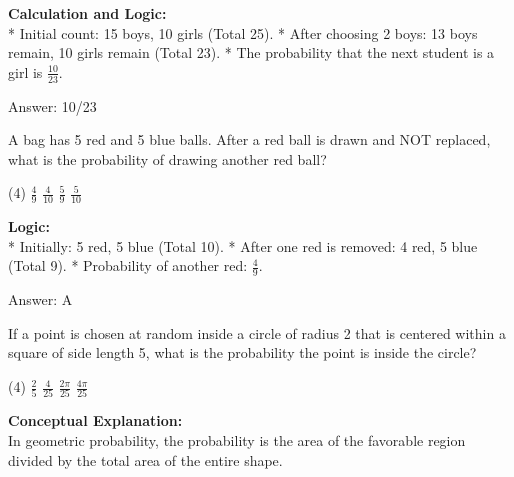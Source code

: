 \documentclass[11pt,paper=a4,answers]{exam}
\begin{document}
\begin{questions}
\begin{solution}
\vspace{30pt}

\textbf{Calculation and Logic:} \\
* Initial count: 15 boys, 10 girls (Total 25).
* After choosing 2 boys: 13 boys remain, 10 girls remain (Total 23).
* The probability that the next student is a girl is $\frac{10}{23}$.

\vspace{30pt}

Answer: \colorbox{yellow!100}{10/23}
\end{solution}

\vspace{60pt}

\question
A bag has 5 red and 5 blue balls. After a red ball is drawn and NOT replaced, what is the probability of drawing another red ball?
\begin{tasks}(4)
    \task $\frac{4}{9}$
    \task $\frac{4}{10}$
    \task $\frac{5}{9}$
    \task $\frac{5}{10}$
\end{tasks}

\begin{solution}
\textbf{Logic:} \\
* Initially: 5 red, 5 blue (Total 10).
* After one red is removed: 4 red, 5 blue (Total 9).
* Probability of another red: $\frac{4}{9}$.

\vspace{30pt}

Answer: \colorbox{yellow!100}{A}
\end{solution}

\vspace{60pt}

\question
If a point is chosen at random inside a circle of radius 2 that is centered within a square of side length 5, what is the probability the point is inside the circle?
\begin{tasks}(4)
    \task $\frac{2}{5}$
    \task $\frac{4}{25}$
    \task $\frac{2\pi}{25}$
    \task $\frac{4\pi}{25}$
\end{tasks}

\begin{solution}
\textbf{Conceptual Explanation:} \\
In geometric probability, the probability is the area of the favorable region divided by the total area of the entire shape.




\end{solution}
\end{questions}
\end{document}

